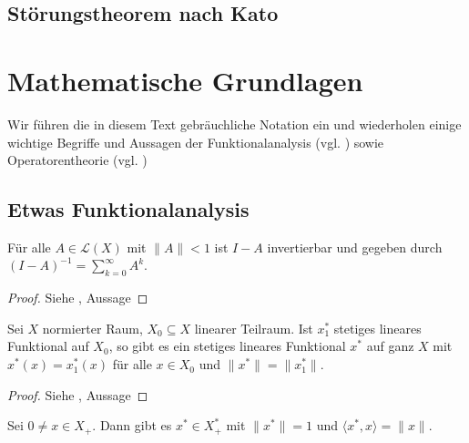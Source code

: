 \section{Störungstheorem nach Kato}

\chapter{Mathematische Grundlagen}

\par
Wir führen die in diesem Text gebräuchliche Notation ein und wiederholen einige wichtige Begriffe und Aussagen der Funktionalanalysis (vgl. \cite{})  sowie Operatorentheorie (vgl. \cite{engel_nagel_2006})


\section{Etwas Funktionalanalysis}

\begin{fsatz}\label{Satz von der Neumann'schen Reihe}
Für alle $A\in \mathcal L(X)$ mit $\|A\| < 1$ ist $I-A$ invertierbar und gegeben durch $(I-A)^{-1}=\sum_{k=0}^\infty A^k$.
\end{fsatz}

\begin{proof}
Siehe \cite{}, Aussage 
\end{proof}




\begin{fsatz}
Sei $X$ normierter Raum, $X_0\subseteq X$ linearer Teilraum. Ist $x_1^*$ stetiges lineares Funktional auf $X_0$, so gibt es ein stetiges lineares Funktional $x^*$ auf ganz $X$ mit $x^*(x)=x_1^*(x)$ für alle $x\in X_0$ und $\|x^*\|=\|x_1^*\|$.
\end{fsatz}

\begin{proof}
Siehe \cite{}, Aussage
\end{proof}

\begin{lem}\label{Lemma nach Hahn-Banach}
Sei $0\neq x\in X_+$. Dann gibt es $x^*\in X^*_+$ mit $\|x^*\|= 1$ und $\langle x^*, x\rangle = \|x\|$.
\end{lem}

